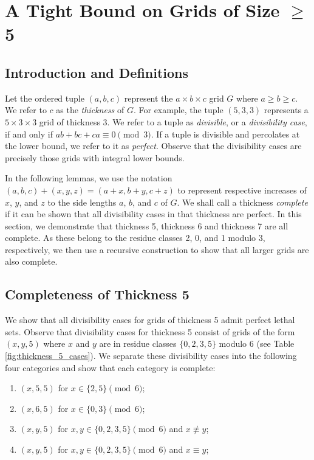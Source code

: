 \chapter{A Tight Bound on Grids of Size $\geq$ 5}

\section{Introduction and Definitions}
Let the ordered tuple $(a,b,c)$ represent the $a \times b \times c$ grid $G$ where $a \geq b \geq c$. We refer to $c$ as the \emph{thickness} of $G$. For example, the tuple $(5,3,3)$ represents a $5 \times 3 \times 3$ grid of thickness 3. We refer to a tuple as \emph{divisible}, or a \emph{divisibility case}, if and only if $ab+bc+ca \equiv 0 \pmod 3$. If a tuple is divisible and percolates at the lower bound, we refer to it as \emph{perfect}. Observe that the divisibility cases are precisely those grids with integral lower bounds.

In the following lemmas, we use the notation $(a,b,c)+(x,y,z) = (a+x, b+y, c+z)$ to represent respective increases of $x$, $y$, and $z$ to the side lengths $a$, $b$, and $c$ of $G$. We shall call a thickness \emph{complete} if it can be shown that all divisibility cases in that thickness are perfect. In this section, we demonstrate that thickness 5, thickness 6 and thickness 7 are all complete. As these belong to the residue classes 2, 0, and 1 modulo 3, respectively, we then use a recursive construction to show that all larger grids are also complete. 

\section{Completeness of Thickness 5}
We show that all divisibility cases for grids of thickness 5 admit perfect lethal sets. Observe that divisibility cases for thickness 5 consist of grids of the form $(x,y,5)$ where $x$ and $y$ are in residue classes $\{0,2,3,5\}$ modulo 6 (see Table \ref{fig:thickness_5_cases}). We separate these divisibility cases into the following four categories and show that each category is complete:

\begin{enumerate}
\item $(x,5,5)$ for $x \in \{2,5\} \pmod 6$;
\item $(x,6,5)$ for $x \in \{0,3\} \pmod 6$;
\item $(x,y,5)$ for $x,y \in \{0,2,3,5\} \pmod 6$ and $x \not\equiv y$;
\item $(x,y,5)$ for $x,y \in \{0,2,3,5\} \pmod 6$ and $x \equiv y$;
\end{enumerate}

